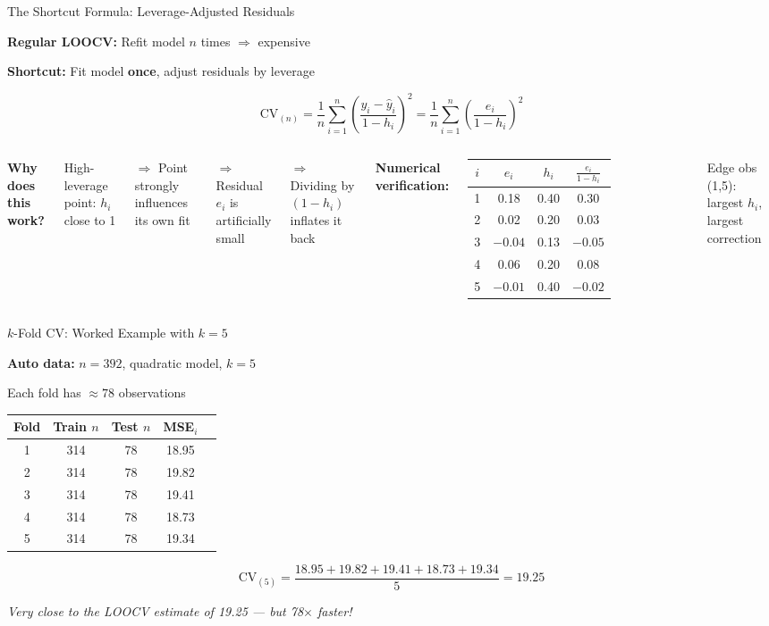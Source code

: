 \documentclass[aspectratio=169, 11pt]{beamer}
\begin{document}
\begin{frame}{The Shortcut Formula: Leverage-Adjusted Residuals}

\textbf{Regular LOOCV:} Refit model $n$ times $\Rightarrow$ expensive

\textbf{Shortcut:} Fit model \textbf{once}, adjust residuals by leverage

$$\text{CV}_{(n)} = \frac{1}{n}\sum_{i=1}^{n}\left(\frac{y_i - \hat{y}_i}{1 - h_i}\right)^2 = \frac{1}{n}\sum_{i=1}^{n}\left(\frac{e_i}{1 - h_i}\right)^2$$

\begin{columns}
\textbf{Why does this work?}

High-leverage point: $h_i$ close to 1

$\Rightarrow$ Point strongly influences its own fit

$\Rightarrow$ Residual $e_i$ is artificially small

$\Rightarrow$ Dividing by $(1-h_i)$ inflates it back

\textbf{Numerical verification:}

\begin{tabular}{cccc}
\toprule
$i$ & $e_i$ & $h_i$ & $\frac{e_i}{1-h_i}$ \\
\midrule
1 & 0.18 & 0.40 & 0.30 \\
2 & 0.02 & 0.20 & 0.03 \\
3 & $-0.04$ & 0.13 & $-0.05$ \\
4 & 0.06 & 0.20 & 0.08 \\
5 & $-0.01$ & 0.40 & $-0.02$ \\
\bottomrule
\end{tabular}

\footnotesize Edge obs (1,5): largest $h_i$, largest correction
\end{columns}
\end{frame}


\begin{frame}{$k$-Fold CV: Worked Example with $k=5$}

\textbf{Auto data:} $n = 392$, quadratic model, $k = 5$

Each fold has $\approx 78$ observations

\vspace{0.3em}
\begin{center}
\begin{tabular}{ccccc}
\toprule
Fold & Train $n$ & Test $n$ & MSE$_i$ \\
\midrule
1 & 314 & 78 & 18.95 \\
2 & 314 & 78 & 19.82 \\
3 & 314 & 78 & 19.41 \\
4 & 314 & 78 & 18.73 \\
5 & 314 & 78 & 19.34 \\
\bottomrule
\end{tabular}
\end{center}

$$\text{CV}_{(5)} = \frac{18.95 + 19.82 + 19.41 + 18.73 + 19.34}{5} = 19.25$$

\textit{Very close to the LOOCV estimate of 19.25 --- but 78$\times$ faster!}
\end{frame}
\end{document}
